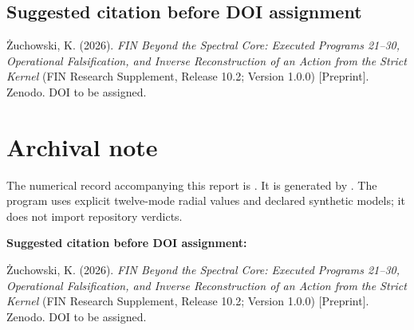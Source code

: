 \documentclass[11pt,a4paper,openany]{report}
\begin{document}
\section{Suggested citation before DOI assignment}

Żuchowski, K. (2026). \emph{FIN Beyond the Spectral Core: Executed Programs 21–30, Operational Falsification, and Inverse Reconstruction of an Action from the Strict Kernel} (FIN Research Supplement, Release 10.2; Version 1.0.0) [Preprint]. Zenodo. DOI to be assigned.


\clearpage
\chapter*{Archival note}
The numerical record accompanying this report is . It is generated by . The program uses explicit twelve-mode radial values and declared synthetic models; it does not import repository verdicts.

\medskip
\noindent\textbf{Suggested citation before DOI assignment:}

Żuchowski, K. (2026). \emph{FIN Beyond the Spectral Core: Executed Programs 21--30, Operational Falsification, and Inverse Reconstruction of an Action from the Strict Kernel} (FIN Research Supplement, Release 10.2; Version 1.0.0) [Preprint]. Zenodo. DOI to be assigned.
\end{document}

